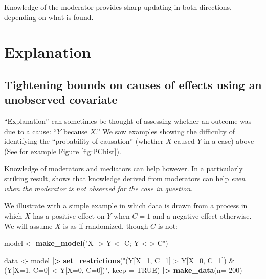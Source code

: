 \documentclass[
  12pt,
]{book}
\newenvironment{Shaded}{\begin{snugshade}}{\end{snugshade}}
\newcommand{\AttributeTok}[1]{\textcolor[rgb]{0.13,0.29,0.53}{#1}}
\newcommand{\ConstantTok}[1]{\textcolor[rgb]{0.56,0.35,0.01}{#1}}
\newcommand{\DecValTok}[1]{\textcolor[rgb]{0.00,0.00,0.81}{#1}}
\newcommand{\FunctionTok}[1]{\textcolor[rgb]{0.13,0.29,0.53}{\textbf{#1}}}
\newcommand{\NormalTok}[1]{#1}
\newcommand{\OtherTok}[1]{\textcolor[rgb]{0.56,0.35,0.01}{#1}}
\newcommand{\SpecialCharTok}[1]{\textcolor[rgb]{0.81,0.36,0.00}{\textbf{#1}}}
\newcommand{\StringTok}[1]{\textcolor[rgb]{0.31,0.60,0.02}{#1}}
\begin{document}
Knowledge of the moderator provides sharp updating in both directions, depending on what is found.

\hypertarget{explanation}{%
\chapter{Explanation}\label{explanation}}

\hypertarget{tightening-bounds-on-causes-of-effects-using-an-unobserved-covariate}{%
\section{Tightening bounds on causes of effects using an unobserved covariate}\label{tightening-bounds-on-causes-of-effects-using-an-unobserved-covariate}}

``Explanation'' can sometimes be thought of assessing whether an outcome was due to a cause: ``\(Y\) because \(X\).'' We saw examples showing the difficulty of identifying the ``probability of causation'' (whether \(X\) caused \(Y\) in a case) above (See for example Figure \ref{fig:PChist}).

Knowledge of moderators and mediators can help however. In a particularly striking result, \citet{dawid2011role} shows that knowledge derived from moderators can help \emph{even when the moderator is not observed for the case in question}.

We illustrate with a simple example in which data is drawn from a process in which \(X\) has a positive effect on \(Y\) when \(C=1\) and a negative effect otherwise. We will assume \(X\) is as-if randomized, though \(C\) is not:

\begin{Shaded}
\begin{Highlighting}[]
\NormalTok{model }\OtherTok{\textless{}{-}} \FunctionTok{make\_model}\NormalTok{(}\StringTok{"X {-}\textgreater{} Y \textless{}{-} C; Y \textless{}{-}\textgreater{} C"}\NormalTok{)}

\NormalTok{data }\OtherTok{\textless{}{-}} 
\NormalTok{  model }\SpecialCharTok{|\textgreater{}}
  \FunctionTok{set\_restrictions}\NormalTok{(}\StringTok{"(Y[X=1, C=1] \textgreater{} Y[X=0, C=1]) \& }
\StringTok{                    (Y[X=1, C=0] \textless{} Y[X=0, C=0])"}\NormalTok{, }\AttributeTok{keep =} \ConstantTok{TRUE}\NormalTok{) }\SpecialCharTok{|\textgreater{}}
  \FunctionTok{make\_data}\NormalTok{(}\AttributeTok{n=} \DecValTok{200}\NormalTok{)}
\end{Highlighting}
\end{Shaded}
\end{document}
